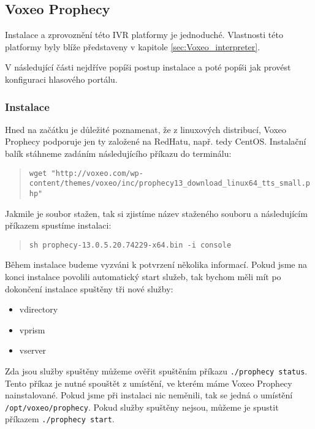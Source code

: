 \documentclass[ing,male,java,dept460,twoside]{diploma}						%
\begin{document}
\subsection{Voxeo Prophecy}
\label{sec:voxeo_conf}
Instalace a zprovoznění této IVR platformy je jednoduché. Vlastnosti této platformy byly blíže představeny v kapitole \ref{sec:Voxeo_interpreter}.

V následující části nejdříve popíši postup instalace a poté popíši jak provést konfiguraci hlasového portálu.

\subsubsection{Instalace}
Hned na začátku je důležité poznamenat, že z linuxových distribucí, Voxeo Prophecy podporuje jen ty založené na RedHatu, např. tedy CentOS. Instalační balík stáhneme zadáním následujícího příkazu do terminálu:

\begin{quote}
\begin{sloppypar}
	\texttt{wget "http://voxeo.com/wp-content/themes/voxeo/inc/prophecy13\allowbreak\_download\_linux64\_tts\_small.php"}
\end{sloppypar}
\end{quote}

Jakmile je soubor stažen, tak si zjistíme název staženého souboru a následujícím příkazem spustíme instalaci:

\begin{quote}
	\texttt{sh prophecy-13.0.5.20.74229-x64.bin -i console}
\end{quote}

Během instalace budeme vyzváni k potvrzení několika informací. Pokud jsme na konci instalace povolili automatický start služeb, tak bychom měli mít po dokončení instalace spuštěny tři nové služby:

\begin{itemize}
\item vdirectory
\item vprism
\item vserver
\end{itemize}

Zda jsou služby spuštěny můžeme ověřit spuštěním příkazu \texttt{./prophecy status}. Tento příkaz je nutné spouštět z umístění, ve kterém máme Voxeo Prophecy nainstalované. Pokud jsme při instalaci nic neměnili, tak se jedná o umístění \texttt{/opt/voxeo/prophecy}. Pokud služby spuštěny nejsou, můžeme je spustit příkazem \texttt{./prophecy start}.
\end{document}
